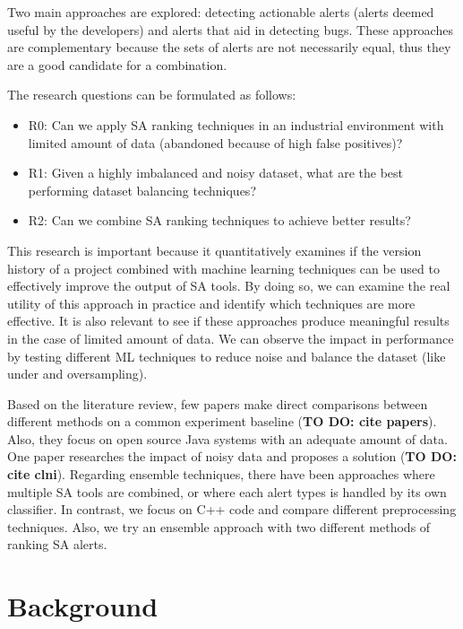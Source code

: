 \documentclass{article}
\begin{document}
Two main approaches are explored: detecting actionable alerts (alerts deemed useful by the developers) and alerts that aid in detecting bugs. These approaches are complementary because the sets of alerts are not necessarily equal, thus they are a good candidate for a combination.

The research questions can be formulated as follows:
\begin{itemize}
    \item R0: Can we apply SA ranking techniques in an industrial environment with limited amount of data (abandoned because of high false positives)?
    \item R1: Given a highly imbalanced and noisy dataset, what are the best performing dataset balancing techniques?
    \item R2: Can we combine SA ranking techniques to achieve better results?
\end{itemize}

This research is important because it quantitatively examines if the version history of a project combined with machine learning techniques can be used to effectively improve the output of SA tools. By doing so, we can examine the real utility of this approach in practice and identify which techniques are more effective. It is also relevant to see if these approaches produce meaningful results in the case of limited amount of data. We can observe the impact in performance by testing different ML techniques to reduce noise and balance the dataset (like under and oversampling). 

Based on the literature review, few papers make direct comparisons between different methods on a common experiment baseline (\textbf{TO DO: cite papers}). Also, they focus on open source Java systems with an adequate amount of data. One paper researches the impact of noisy data and proposes a solution (\textbf{TO DO: cite clni}). Regarding ensemble techniques, there have been approaches where multiple SA tools are combined, or where each alert types is handled by its own classifier. In contrast, we focus on C++ code and compare different preprocessing techniques. Also, we try an ensemble approach with two different methods of ranking SA alerts.

\section{Background}
\end{document}
